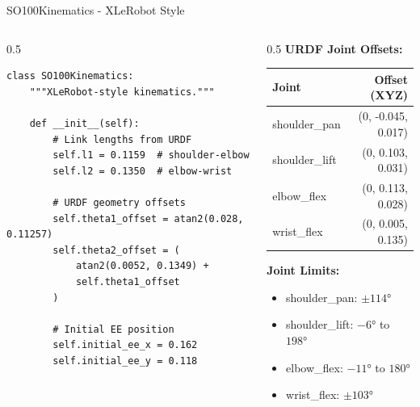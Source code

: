 \begin{frame}[fragile]{SO100Kinematics - XLeRobot Style}
\begin{columns}
\begin{column}{0.5\textwidth}
\begin{lstlisting}
class SO100Kinematics:
    """XLeRobot-style kinematics."""

    def __init__(self):
        # Link lengths from URDF
        self.l1 = 0.1159  # shoulder-elbow
        self.l2 = 0.1350  # elbow-wrist

        # URDF geometry offsets
        self.theta1_offset = atan2(0.028, 0.11257)
        self.theta2_offset = (
            atan2(0.0052, 0.1349) +
            self.theta1_offset
        )

        # Initial EE position
        self.initial_ee_x = 0.162
        self.initial_ee_y = 0.118
\end{lstlisting}
\end{column}
\begin{column}{0.5\textwidth}
    \textbf{URDF Joint Offsets:}
    \begin{table}
    \centering
    \footnotesize
    \begin{tabular}{lr}
    \toprule
    \textbf{Joint} & \textbf{Offset (XYZ)} \\
    \midrule
    shoulder\_pan & (0, -0.045, 0.017) \\
    shoulder\_lift & (0, 0.103, 0.031) \\
    elbow\_flex & (0, 0.113, 0.028) \\
    wrist\_flex & (0, 0.005, 0.135) \\
    \bottomrule
    \end{tabular}
    \end{table}

    \vspace{0.3cm}

    \textbf{Joint Limits:}
    \begin{itemize}
        \item shoulder\_pan: $\pm 114°$
        \item shoulder\_lift: $-6°$ to $198°$
        \item elbow\_flex: $-11°$ to $180°$
        \item wrist\_flex: $\pm 103°$
    \end{itemize}
\end{column}
\end{columns}
\end{frame}

